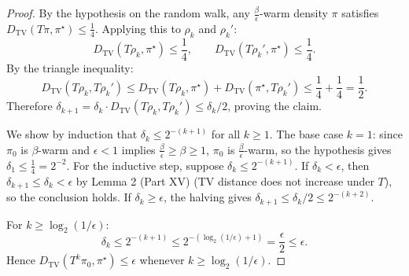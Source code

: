 \begin{proof}
By the hypothesis on the random walk, any $\frac{\beta}{\epsilon}$-warm density $\pi$ satisfies $D_{\mathrm{TV}}(T\pi, \pi^\star) \le \frac{1}{4}$. Applying this to $\rho_k$ and $\rho_k'$:
\[
D_{\mathrm{TV}}(T\rho_k, \pi^\star) \le \frac{1}{4}, \qquad D_{\mathrm{TV}}(T\rho_k', \pi^\star) \le \frac{1}{4}.
\]
By the triangle inequality:
\[
D_{\mathrm{TV}}(T\rho_k, T\rho_k') \le D_{\mathrm{TV}}(T\rho_k, \pi^\star) + D_{\mathrm{TV}}(\pi^\star, T\rho_k') \le \frac{1}{4} + \frac{1}{4} = \frac{1}{2}.
\]
Therefore $\delta_{k+1} = \delta_k \cdot D_{\mathrm{TV}}(T\rho_k, T\rho_k') \le \delta_k / 2$, proving the claim.

We show by induction that $\delta_k \le 2^{-(k+1)}$ for all $k \ge 1$. The base case $k = 1$: since $\pi_0$ is $\beta$-warm and $\epsilon < 1$ implies $\frac{\beta}{\epsilon} \ge \beta \ge 1$, $\pi_0$ is $\frac{\beta}{\epsilon}$-warm, so the hypothesis gives $\delta_1 \le \frac{1}{4} = 2^{-2}$. For the inductive step, suppose $\delta_k \le 2^{-(k+1)}$. If $\delta_k < \epsilon$, then $\delta_{k+1} \le \delta_k < \epsilon$ by Lemma 2 (Part XV) (TV distance does not increase under $T$), so the conclusion holds. If $\delta_k \ge \epsilon$, the halving gives $\delta_{k+1} \le \delta_k / 2 \le 2^{-(k+2)}$.

For $k \ge \log_2(1/\epsilon)$:
\[
\delta_k \le 2^{-(k+1)} \le 2^{-(\log_2(1/\epsilon) + 1)} = \frac{\epsilon}{2} \le \epsilon.
\]
Hence $D_{\mathrm{TV}}(T^k \pi_0, \pi^\star) \le \epsilon$ whenever $k \ge \log_2(1/\epsilon)$.
\end{proof}
